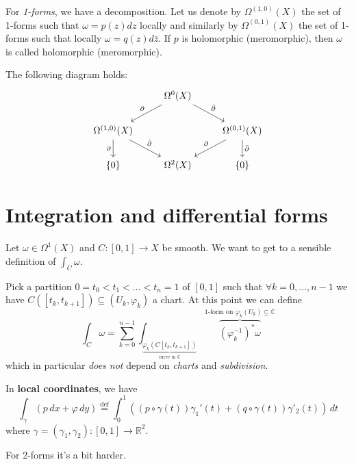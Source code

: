 For \emph{1-forms}, we have a decomposition. Let us denote by
\(\Omega^{{(1,0)}}{(X)}\) the set of 1-forms such that \(\omega = p{(z)}dz\)
locally and similarly by \(\Omega^{{(0,1)}}{(X)}\) the set of 1-forms such that
locally \(\omega = q{(z)} d\bar{z}\). If \(p\) is holomorphic (meromorphic), then \(\omega\)
is called holomorphic (meromorphic).

The following diagram holds:
\[
\begin{tikzcd}
	& {\Omega^0(X)} & \\
	{\Omega^{(1,0)}(X)} && {\Omega^{(0,1)}(X)} \\
	{\{0\}} & {\Omega^2(X)} & {\{0\}}
	\arrow["\partial"', from=1-2, to=2-1]
	\arrow["{\bar{\partial}}", from=1-2, to=2-3]
	\arrow["\partial"', from=2-1, to=3-1]
	\arrow["{\bar{\partial}}", from=2-1, to=3-2]
	\arrow["\partial"', from=2-3, to=3-2]
	\arrow["{\bar{\partial}}", from=2-3, to=3-3]
\end{tikzcd}
\]

\section{Integration and differential forms}

Let \(\omega \in \Omega^{1}{(X)}\) and \(C : [0, 1] \to X\) be smooth. We want
to get to a sensible definition of \(\int _C \omega\).

Pick a partition \(0 = t_{0} < t_{1} < \dots < t_{n} = 1\) of \([0, 1]\) such
that \(\forall k = 0, \dots, n-1\) we have \(C{([t_k, t_{k+1}])} \subseteq
{(U_k, \varphi _k)} \) a chart. At this point we can define
\begin{equation}\label{eq:defin_int}
    \int _C \omega = \sum_{k=0}^{n-1} \int_{\underbrace{\varphi_k {(C[t_k,
    t_{k+1} ])}}_{\text{curve in \(\mathbb{C}\)}}}
    \overbrace{{\left( \varphi ^{-1}_k \right)}^{*} \omega}^\text{1-form on
    \(\varphi _k{(U_k)} \subseteq \mathbb{C} \)} 
\end{equation}
which in particular \emph{does not} depend on \emph{charts} and
\emph{subdivision}. 

In \textbf{local coordinates}, we have
\[
  \int_{\gamma} {\left( p \,dx + \varphi \,dy \right)} \overset{\text{def}}{=}
  \int_{0}^{1} {\left( {\left( p \circ \gamma{(t)} \right)} \gamma_1'{(t)} +
  {\left( q \circ \gamma{(t)} \right)} \gamma'_2 {(t)} \right)} \, dt
\]
where \(\gamma = {(\gamma_{1}, \gamma_{2})}: [0, 1] \to \mathbb{R}^2\).

For 2-forms it's a bit harder.


